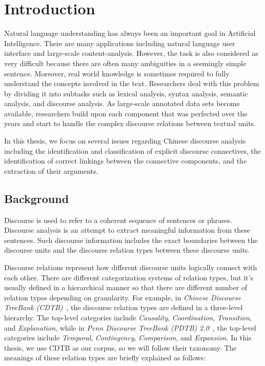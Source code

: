 %
%
%
\chapter{Introduction}
\label{c:intro}

Natural language understanding has always been an important goal in Artificial
Intelligence. There are many applications including natural language user
interface and large-scale content-analysis. However, the task is also considered
as very difficult because there are often many ambiguities in a seemingly
simple sentence. Moreover, real world knowledge is sometimes required to fully
understand the concepts involved in the text. Researchers deal with this problem by dividing it into subtasks such as lexical
analysis, syntax analysis, semantic analysis, and discourse analysis.
As large-scale annotated data sets become available, researchers build
upon each component that was perfected over the years and start to handle the
complex discourse relations between textual units.

In this thesis, we focus on several issues regarding Chinese discourse analysis
including the identification and classification of explicit discourse connectives,
the identification of correct linkings between the connective components, and the extraction
of their arguments. 

%
%
\section{Background}

Discourse is used to refer to a coherent sequence of sentences or phrases.
Discourse analysis is an attempt to extract meaningful information from
these sentences. Such discourse information includes the exact boundaries
between the discourse units and the discourse relation types between
these discourse units.

Discourse relations represent how different discourse units logically connect
with each other.  There are different categorization systems of relation types, but
it's usually defined in a hierarchical manner so that there are different number
of relation types depending on granularity. For example, in
\textit{Chinese Discourse TreeBank (CDTB)}~\citep{li2014building}, the discourse
relation types are defined in a three-level hierarchy. The top-level categories
include \textit{Causality}, \textit{Coordination}, \textit{Transition},
and \textit{Explanation},
while in \textit{Penn Discourse TreeBank (PDTB) 2.0}~\citep{Prasad08thepenn},
the top-level categories include \textit{Temporal}, \textit{Contingency},
\textit{Comparison}, and \textit{Expansion}. In this thesis, we use
CDTB as our corpus, so we will follow their taxonomy. The meanings of these
relation types are briefly explained as follows:

